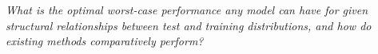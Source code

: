 \begin{comment}
In practice, causality- and invariance-based methods often result in wrong representations of the data  \citep{kamath2021does,rosenfeld2020risks}, 
because the setting is slightly misspecified or the data is not heterogeneous enough. 
Empirically, %
these methods often perform at least as poorly as empirical risk minimization (ERM) that ignores the multi-environment information
\citep{ahuja2020empirical,gulrajani2021in,rosenfeld2022online}. Although many possible explanations have been proposed in the literature for this breakdown of invariance-based methods, in our work, we concentrate on a sptype of misspecification previously underexplored in the theoretical line of research -- \fy{when the robust risk is not identifiable?}
where not only the causal parameter, but the robust risk \eqref{eq:conventional-robust-risk} is not determinable using training data either.
\end{comment}


\begin{center}
\emph{
What is the optimal worst-case performance any model can have for given structural relationships between test and training distributions, and how do existing methods comparatively perform?}
\end{center}

